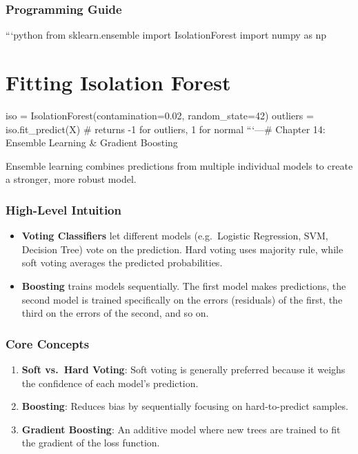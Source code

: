 \subsubsection{Programming Guide}\label{programming-guide-12}

```python from sklearn.ensemble import IsolationForest import numpy as
np

\section{Fitting Isolation Forest}\label{fitting-isolation-forest}

iso = IsolationForest(contamination=0.02, random\_state=42) outliers =
iso.fit\_predict(X) \# returns -1 for outliers, 1 for normal
```\n\n---\n\n\# Chapter 14: Ensemble Learning \& Gradient Boosting

Ensemble learning combines predictions from multiple individual models
to create a stronger, more robust model.

\subsubsection{High-Level Intuition}\label{high-level-intuition-13}

\begin{itemize}
\tightlist
\item
  \textbf{Voting Classifiers} let different models (e.g.~Logistic
  Regression, SVM, Decision Tree) vote on the prediction. Hard voting
  uses majority rule, while soft voting averages the predicted
  probabilities.
\item
  \textbf{Boosting} trains models sequentially. The first model makes
  predictions, the second model is trained specifically on the errors
  (residuals) of the first, the third on the errors of the second, and
  so on.
\end{itemize}

\subsubsection{Core Concepts}\label{core-concepts-7}

\begin{enumerate}
\def\labelenumi{\arabic{enumi}.}
\tightlist
\item
  \textbf{Soft vs.~Hard Voting}: Soft voting is generally preferred
  because it weighs the confidence of each model's prediction.
\item
  \textbf{Boosting}: Reduces bias by sequentially focusing on
  hard-to-predict samples.
\item
  \textbf{Gradient Boosting}: An additive model where new trees are
  trained to fit the gradient of the loss function.
\end{enumerate}

